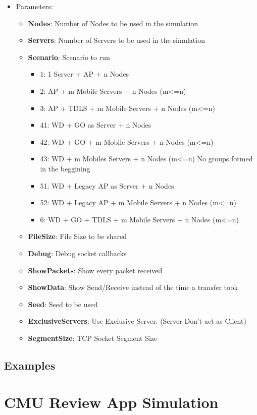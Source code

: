 \documentclass[a4paper]{book}
\begin{document}
\begin{itemize}
	\item[] Parameters:
	\begin{itemize}
		\item[] \textbf{Nodes}: Number of Nodes to be used in the simulation
		\item[] \textbf{Servers}: Number of Servers to be used in the simulation
		\item[] \textbf{Scenario}: Scenario to run
		\begin{itemize}
			\item 1: 1 Server + AP + n Nodes
			\item 2: AP + m Mobile Servers + n Nodes (m<=n)
			\item 3: AP + TDLS + m Mobile Servers + n Nodes (m<=n)
			\item 41: WD + GO as Server + n Nodes
			\item 42: WD + GO + m Mobile Servers + n Nodes (m<=n)
			\item 43: WD + m Mobiles Servers + n Nodes (m<=n) No groups formed in the beggining
			\item 51: WD + Legacy AP as Server + n Nodes
			\item 52: WD + Legacy AP + m Mobile Servers + n Nodes (m<=n)
			\item 6: WD + GO + TDLS + m Mobile Servers + n Nodes (m<=n)
		\end{itemize}
		\item[] \textbf{FileSize}: File Size to be shared
		\item[] \textbf{Debug}: Debug socket callbacks
		\item[] \textbf{ShowPackets}: Show every packet received
		\item[] \textbf{ShowData}: Show Send/Receive instead of the time a transfer took
		\item[] \textbf{Seed}: Seed to be used
		\item[] \textbf{ExclusiveServers}: Use Exclusive Server. (Server Don't act as Client)
		\item[] \textbf{SegmentSize}: TCP Socket Segment Size
	\end{itemize}
\end{itemize}	

\subsection{Examples}



\section{CMU Review App Simulation}
\end{document}
